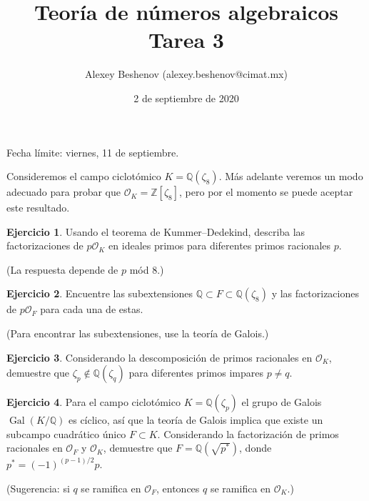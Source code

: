 \documentclass{article}
\title{Teoría de números algebraicos\\Tarea 3}
\author{Alexey Beshenov (alexey.beshenov@cimat.mx)}
\date{2 de septiembre de 2020}
\newcounter{tarea}
\theoremstyle{definition}
\newtheorem{ejercicio}{Ejercicio}[tarea]
\begin{document}
{\sffamily\bfseries\maketitle}

\noindent Fecha límite: viernes, 11 de septiembre.

\ifdefined\solutions
\else
\thispagestyle{empty}
\fi

\vspace{1em}

Consideremos el campo ciclotómico $K = \mathbb{Q} (\zeta_8)$.
Más adelante veremos un modo adecuado para probar que
$\mathcal{O}_K = \mathbb{Z}[\zeta_8]$, pero por el momento se puede aceptar este
resultado.

\begin{ejercicio}
  Usando el teorema de Kummer--Dedekind, describa las factorizaciones de
  $p \mathcal{O}_K$ en ideales primos para diferentes primos racionales $p$.

  \noindent (La respuesta depende de $p$ mód $8$.)
\end{ejercicio}

\begin{ejercicio}
  Encuentre las subextensiones
  $\mathbb{Q} \subset F \subset \mathbb{Q} (\zeta_8)$ y las factorizaciones de
  $p \mathcal{O}_F$ para cada una de estas.

  \noindent (Para encontrar las subextensiones, use la teoría de Galois.)
\end{ejercicio}

\begin{ejercicio}
  Considerando la descomposición de primos racionales en $\mathcal{O}_K$,
  demuestre que $\zeta_p \notin \mathbb{Q} (\zeta_q)$ para diferentes primos
  impares $p \ne q$.
\end{ejercicio}

\begin{ejercicio}
  Para el campo ciclotómico $K = \mathbb{Q} (\zeta_p)$ el grupo de Galois
  $\operatorname{Gal} (K/\mathbb{Q})$ es cíclico, así que la teoría de Galois
  implica que existe un subcampo cuadrático único $F \subset K$. Considerando
  la factorización de primos racionales en $\mathcal{O}_F$ y $\mathcal{O}_K$,
  demuestre que $F = \mathbb{Q} (\sqrt{p^*})$, donde $p^* = (-1)^{(p-1)/2} p$.

  \noindent (Sugerencia: si $q$ se ramifica en $\mathcal{O}_F$, entonces $q$ se
  ramifica en $\mathcal{O}_K$.)
\end{ejercicio}
\end{document}
